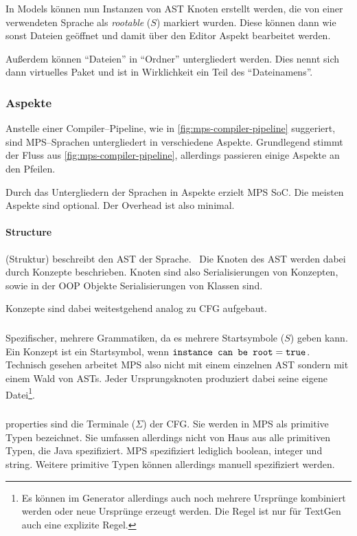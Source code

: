In Models können nun Instanzen von \ac{AST} Knoten erstellt werden, die von einer verwendeten Sprache als \textit {rootable} ($S$) markiert wurden.
Diese können dann wie sonst Dateien geöffnet und damit über den Editor Aspekt bearbeitet werden.

Außerdem können \enquote{Dateien} in \enquote{Ordner} untergliedert werden.
Dies nennt sich dann virtuelles Paket und ist in Wirklichkeit ein Teil des \enquote{Dateinamens}.

\subsubsection{Aspekte}\label{subsubsec:aspekte}
Anstelle einer Compiler--Pipeline, wie in \autoref{fig:mps-compiler-pipeline} suggeriert, sind \acs{MPS}--Sprachen untergliedert in verschiedene Aspekte.
Grundlegend stimmt der Fluss aus \autoref{fig:mps-compiler-pipeline}, allerdings passieren einige Aspekte an den Pfeilen.

Durch das Untergliedern der Sprachen in Aspekte erzielt \ac{MPS} \ac{SoC}.
Die meisten Aspekte sind optional.
Der Overhead ist also minimal.

\paragraph{Structure} (Struktur) beschreibt den \ac{AST} der Sprache.~\autocite{jetbrains-sro-no-dateG}
Die Knoten des \ac{AST} werden dabei durch Konzepte beschrieben.
Knoten sind also Serialisierungen von Konzepten, sowie in der \ac{OOP} Objekte Serialisierungen von Klassen sind.


Konzepte sind dabei weitestgehend analog zu \ac{CFG} aufgebaut.

\subparagraph*{}
Spezifischer, mehrere Grammatiken, da es mehrere Startsymbole ($S$) geben kann.
Ein Konzept ist ein Startsymbol, wenn $\text{\ttfamily instance can be root}=\text{\ttfamily true}$.
Technisch gesehen arbeitet \ac{MPS} also nicht mit einem einzelnen \ac{AST} sondern mit einem Wald von \acp{AST}.
Jeder Ursprungsknoten produziert dabei seine eigene Datei\footnote{Es können im Generator allerdings auch noch mehrere Ursprünge kombiniert werden oder neue Ursprünge erzeugt werden. Die Regel ist nur für TextGen auch eine explizite Regel.}.

\subparagraph*{}
{\ttfamily properties} sind die Terminale ($\Sigma$) der \ac{CFG}.
Sie werden in \ac{MPS} als primitive Typen bezeichnet.
Sie umfassen allerdings nicht von Haus aus alle primitiven Typen, die Java spezifiziert.
\ac{MPS} spezifiziert lediglich {\ttfamily boolean}, {\ttfamily integer} und {\ttfamily string}.
Weitere primitive Typen können allerdings manuell spezifiziert werden.

